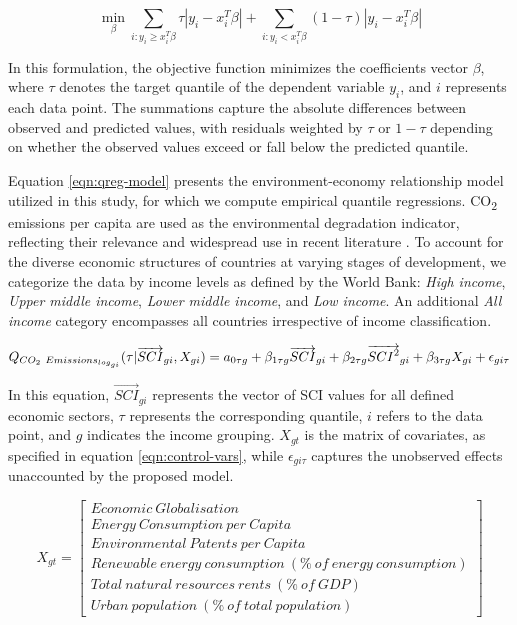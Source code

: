 \documentclass[10pt]{article}
\begin{document}
\begin{equation}\label{eqn:qreg-objective}
 \underset{\beta}{\min}\sum_{i:y_{i}\ge x_{i}^{T}\beta}\tau\left| y_{i} - x_{i}^{T}\beta \right| + \sum_{i:y_{i} < x_{i}^{T}\beta}(1-\tau)\left| y_{i} - x_{i}^{T}\beta \right|
\end{equation}

In this formulation, the objective function minimizes the coefficients vector $\beta$, where $\tau$ denotes the target quantile of the dependent variable $y_{i}$, and $i$ represents each data point. The summations capture the absolute differences between observed and predicted values, with residuals weighted by $\tau$ or $1-\tau$ depending on whether the observed values exceed or fall below the predicted quantile.

Equation \eqref{eqn:qreg-model} presents the environment-economy relationship model utilized in this study, for which we compute empirical quantile regressions. CO\textsubscript{2} emissions per capita are used as the environmental degradation indicator, reflecting their relevance and widespread use in recent literature \citep{zhangEnvironmentalKuznetsCurve2019, khezriEnvironmentalImplicationsEconomic2022}. To account for the diverse economic structures of countries at varying stages of development, we categorize the data by income levels as defined by the World Bank: \textit{High income}, \textit{Upper middle income}, \textit{Lower middle income}, and \textit{Low income}. An additional \textit{All income} category encompasses all countries irrespective of income classification.

\begin{equation}\label{eqn:qreg-model}
 Q_{CO_{2}\ Emissions_{log_{gi}}}(\tau | \overrightarrow{SCI}_{gi}, X_{gi}) = a_{0\tau g} + \beta_{1\tau g} \overrightarrow{SCI}_{gi} + \beta_{2\tau g}\overrightarrow{SCI\textsuperscript{2}}_{gi} + \beta_{3\tau g}X_{gi} + \epsilon_{gi\tau}
\end{equation}

In this equation, $\overrightarrow{SCI}_{gi}$ represents the vector of SCI values for all defined economic sectors, $\tau$ represents the corresponding quantile, $i$ refers to the data point, and $g$ indicates the income grouping. $X_{gt}$ is the matrix of covariates, as specified in equation \eqref{eqn:control-vars}, while $\epsilon_{gi\tau}$ captures the unobserved effects unaccounted by the proposed model.

\begin{equation}\label{eqn:control-vars}
 X_{gt} = \left[ 
            \begin{matrix}
 Economic\ Globalisation \\
 Energy\ Consumption\ per\ Capita \\
 Environmental\ Patents\ per\ Capita \\
 Renewable\ energy\ consumption\ (\%\ of\ energy\ consumption) \\
 Total\ natural\ resources\ rents\ (\%\ of\ GDP) \\
 Urban\ population\ (\%\ of\ total\ population)
            \end{matrix}
 \right]
\end{equation}
\end{document}
